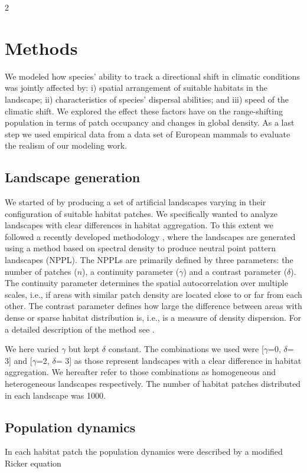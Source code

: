 \documentclass[12pt,pdftex]{article}
\begin{document}
\begin{spacing}{2}
\section*{Methods}

We modeled how species' ability to track a directional shift in climatic conditions was jointly affected by: i) spatial arrangement of suitable habitats in the landscape; ii) characteristics of species' dispersal abilities; and iii) speed of the climatic shift. We explored the effect these factors have on the range-shifting population in terms of patch occupancy and changes in global density. As a last step we used empirical data from a data set of European mammals to evaluate the realism of our modeling work.

\subsection*{Landscape generation}
We started of by producing a set of artificial landscapes varying in their configuration of suitable habitat patches. We specifically wanted to analyze landscapes with clear differences in habitat aggregation. To this extent we followed a recently developed methodology \citep{Lindstrom2011}, where the landscapes are generated using a method based on spectral density to produce neutral point pattern landscapes (NPPL). The NPPLs are primarily defined by three parameters: the number of patches ($n$), a continuity parameter ($\gamma$) and a contrast parameter ($\delta$). The continuity parameter determines the spatial autocorrelation over multiple scales, i.e., if areas with similar patch density are located close to or far from each other. The contrast parameter defines how large the difference between areas with dense or sparse habitat distribution is, i.e., is a measure of density dispersion. For a detailed description of the method see \cite{Lindstrom2011}.

We here varied $\gamma$ but kept $\delta$ constant. The combinations we used were [$\gamma$=0, $\delta$= 3] and [$\gamma$=2, $\delta$= 3] as those represent landscapes with a clear difference in habitat aggregation. We hereafter refer to those combinations as homogeneous and heterogeneous landscapes respectively. The number of habitat patches distributed in each landscape was 1000.

\subsection*{Population dynamics}
In each habitat patch the population dynamics were described by a modified Ricker equation


\end{spacing}
\end{document}
